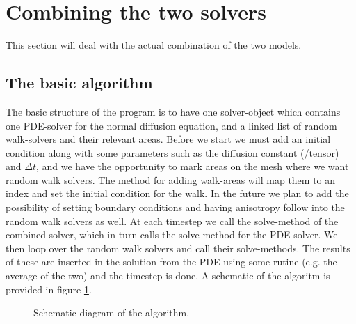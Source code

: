 \section{Combining the two solvers}\label{combining_the_solvers}
This section will deal with the actual combination of the two models.\\

\subsection{The basic algorithm}\label{basic_algorithm}

The basic structure of the program is to have one solver-object which contains one PDE-solver for the normal diffusion equation, and a linked list of random walk-solvers and their relevant areas. 
Before we start we must add an initial condition along with some parameters such as the diffusion constant (/tensor) and $\Delta t$, and we have the opportunity to mark areas on the mesh where we want random walk solvers. 
The method for adding walk-areas will map them to an index and set the initial condition for the walk. 
In the future we plan to add the possibility of setting boundary conditions and having anisotropy follow into the random walk solvers as well.
At each timestep we call the solve-method of the combined solver, which in turn calls the solve method for the PDE-solver. 
We then loop over the random walk solvers and call their solve-methods. 
The results of these are inserted in the solution from the PDE using some rutine (e.g. the average of the two) and the timestep is done. 
A schematic of the algoritm is provided in figure \ref{schematic}.

\begin{figure}[H]
\centering
\caption[Algorithm]{Schematic diagram of the algorithm.}
\label{schematic}
\end{figure}


